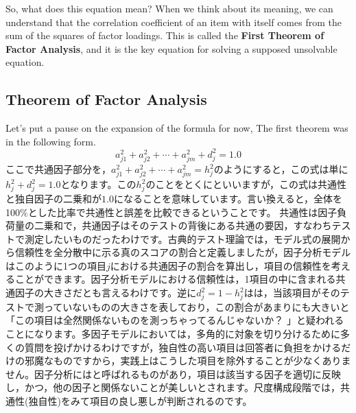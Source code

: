 \documentclass{ltjsbook}
\begin{document}
So, what does this equation mean? When we think about its meaning, we can understand that the correlation coefficient of an item with itself comes from the sum of the squares of factor loadings. This is called the \textbf{First Theorem of Factor Analysis}, and it is the key equation for solving a supposed unsolvable equation.

\subsection{Theorem of Factor Analysis}
Let's put a pause on the expansion of the formula for now,
The first theorem was in the following form.
\[a_{j1}^2+a_{j2}^2+ \cdots + a_{jm}^2 + d_j^2 = 1.0 \]
ここで共通因子部分を，$a_{j1}^2+a_{j2}^2+ \cdots + a_{jm}^2=h_j^2$のようにすると，この式は単に$h_j^2 + d_j^2 = 1.0$となります。この$h_j^2$のことをとくにといいますが，この式は共通性と独自因子の二乗和が$1.0$になることを意味しています。言い換えると，全体を100\%とした比率で共通性と誤差を比較できるということです。
共通性は因子負荷量の二乗和で，共通因子はそのテストの背後にある共通の要因，すなわちテストで測定したいものだったわけです。古典的テスト理論では，モデル式の展開から信頼性を全分散中に示る真のスコアの割合と定義しましたが，因子分析モデルはこのように1つの項目$j$における共通因子の割合を算出し，項目の信頼性を考えることができます。因子分析モデルにおける信頼性は，1項目の中に含まれる共通因子の大きさだとも言えるわけです。逆に$d_j^2=1-h_j^2$はは，当該項目がそのテストで測っていないものの大きさを表しており，この割合があまりにも大きいと「この項目は全然関係ないものを測っちゃってるんじゃないか？ 」と疑われることになります。多因子モデルにおいては，多角的に対象を切り分けるために多くの質問を投げかけるわけですが，独自性の高い項目は回答者に負担をかけるだけの邪魔なものですから，実践上はこうした項目を除外することが少なくありません。因子分析にはと呼ばれるものがあり，項目は該当する因子を適切に反映し，かつ，他の因子と関係ないことが美しいとされます。尺度構成段階では，共通性(独自性)をみて項目の良し悪しが判断されるのです。
\end{document}
